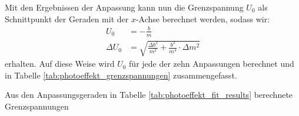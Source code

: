 \documentclass[11pt, a4paper]{article}
\numberwithin{equation}{section}
\begin{document}
Mit den Ergebnissen der Anpassung kann nun die Grenzspannung $U_0$ als Schnittpunkt der Geraden mit der $x$-Achse berechnet werden, sodass wir:
\begin{align*}
	U_0 &= -\frac{b}{m} \\
	\Delta U_0 &= \sqrt{\frac{\Delta b^2}{m^2} + \frac{b^2}{m^4}\cdot \Delta m^2}
\end{align*}
erhalten.
Auf diese Weise wird $U_0$ für jede der zehn Anpassungen berechnet und in Tabelle \ref{tab:photoeffekt_grenzspannungen} zusammengefasst.
\begin{table}[h]
	\centering
	
	\caption{Aus den Anpassungsgeraden in Tabelle \ref{tab:photoeffekt_fit_results} berechnete Grenzspannungen}
	\label{tab:photoeffekt_grenzspannungen}
\end{table}
\end{document}

